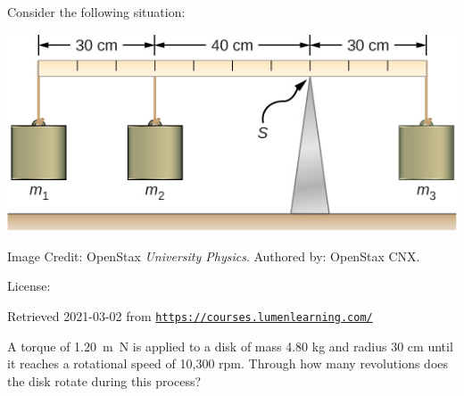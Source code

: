 \documentclass[10pt]{exam}
\begin{document}
\begin{questions}
  

\question
  Consider the following situation:


  \includegraphics{torque_question.jpg}

  {\footnotesize Image Credit: OpenStax \emph{University Physics}. Authored by: OpenStax CNX. }

  {\footnotesize License:} \cc\hspace{-1em}

  {\footnotesize Retrieved 2021-03-02 from \texttt{\href{https://courses.lumenlearning.com/suny-osuniversityphysics/chapter/12-2-examples-of-static-equilibrium/}{https://courses.lumenlearning.com/}} }

  \vspace{1em}


\question
  A torque of \SI{1.20}{\meter\newton} is applied to a disk of mass 4.80 kg and radius 30 cm until it reaches a rotational speed of 10,300 rpm. Through how many revolutions does the disk rotate during this process?
  \vs

\end{questions}
\end{document}
